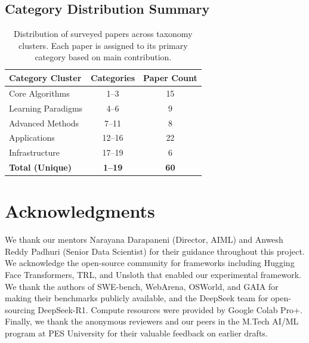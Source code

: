 \documentclass[12pt,a4paper]{report}
\theoremstyle{definition}
\begin{document}
\section*{Category Distribution Summary}

\begin{table}[htbp]
\centering
\begin{tabular}{|l|c|c|}
\hline
\textbf{Category Cluster} & \textbf{Categories} & \textbf{Paper Count} \\
\hline
Core Algorithms & 1--3 & 15 \\
Learning Paradigms & 4--6 & 9 \\
Advanced Methods & 7--11 & 8 \\
Applications & 12--16 & 22 \\
Infrastructure & 17--19 & 6 \\
\hline
\textbf{Total (Unique)} & \textbf{1--19} & \textbf{60} \\
\hline
\end{tabular}
\caption{Distribution of surveyed papers across taxonomy clusters. Each paper is assigned to its primary category based on main contribution.}
\label{tab:category_distribution}
\end{table}

\renewcommand{\bibname}{References}

\cleardoublepage{}
{}




\chapter*{Acknowledgments}

We thank our mentors Narayana Darapaneni (Director, AIML) and Anwesh Reddy Padhuri (Senior Data Scientist) for their guidance throughout this project. We acknowledge the open-source community for frameworks including Hugging Face Transformers, TRL, and Unsloth that enabled our experimental framework. We thank the authors of SWE-bench, WebArena, OSWorld, and GAIA for making their benchmarks publicly available, and the DeepSeek team for open-sourcing DeepSeek-R1. Compute resources were provided by Google Colab Pro+. Finally, we thank the anonymous reviewers and our peers in the M.Tech AI/ML program at PES University for their valuable feedback on earlier drafts.
\end{document}
